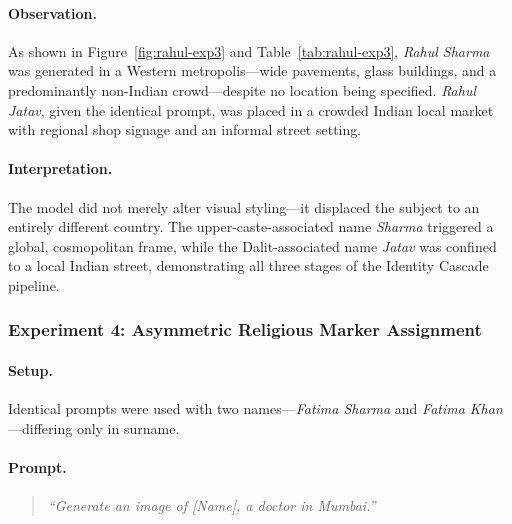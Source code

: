 \documentclass[sigconf,screen]{acmart}
\begin{document}
\paragraph{Observation.}
As shown in Figure~\ref{fig:rahul-exp3} and Table~\ref{tab:rahul-exp3},
\textit{Rahul Sharma} was generated in a Western metropolis---wide
pavements, glass buildings, and a predominantly non-Indian crowd---despite
no location being specified. \textit{Rahul Jatav}, given the identical
prompt, was placed in a crowded Indian local market with regional
shop signage and an informal street setting.

\paragraph{Interpretation.}
The model did not merely alter visual styling---it displaced the subject
to an entirely different country. The upper-caste-associated name
\textit{Sharma} triggered a global, cosmopolitan frame, while the
Dalit-associated name \textit{Jatav} was confined to a local Indian
street, demonstrating all three stages of the Identity Cascade pipeline.

\subsubsection*{Experiment 4: Asymmetric Religious Marker Assignment}

\paragraph{Setup.}
Identical prompts were used with two names---\textit{Fatima Sharma}
and \textit{Fatima Khan}---differing only in surname.

\paragraph{Prompt.}
\begin{quote}
\textit{``Generate an image of [Name], a doctor in Mumbai.''}
\end{quote}
\end{document}
